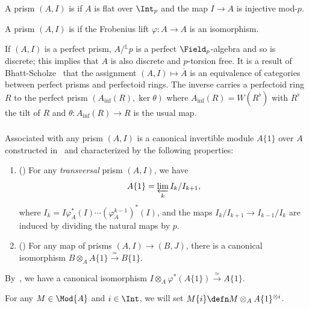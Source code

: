 \documentclass[10pt]{amsart}
\begin{document}
\begin{definition}
A prism $(A,I)$ is  if $A$ is flat over $\Int_p$ and the map $I\to A$ is injective mod-$p$.
\end{definition}


\begin{definition}
A prism $(A,I)$ is  if the Frobenius lift $\varphi:A\to A$ is an isomorphism.
\end{definition}

\begin{remark}
If $(A,I)$ is a perfect prism, $A/{}^{\mathbb{L}}p$ is a perfect $\Field_p$-algebra and so is discrete; this implies that $A$ is also discrete and $p$-torsion free. It is a result of Bhatt-Scholze~\cite[Theorem 3.10]{Bhatt2022-ee} that the assignment $(A,I)\mapsto \overline{A}$ is an equivalence of categories between perfect prisms and perfectoid rings. The inverse carries a perfectoid ring $R$ to the perfect prism $(A_{\mathrm{inf}}(R),\ker \theta)$ where $A_{\mathrm{inf}}(R) = W(R^\flat)$ with $R^\flat$ the tilt of $R$ and $\theta:A_{\mathrm{inf}}(R)\to R$ is the usual map.
\end{remark}


\subsubsection{}
\label{subsubsec:abstract_bk_twist}
Associated with any prism $(A,I)$ is a canonical invertible module $A\{1\}$ over $A$ constructed in~\cite[Proposition 2.5.1]{bhatt2022absolute} and characterized by the following properties:
\begin{enumerate}
    \item (\cite[(2.2.11)]{bhatt2022absolute}) For any \emph{transversal} prism $(A,I)$, we have
   \[
     A\{1\} = \varprojlim_k I_k/I_{k+1},
   \]
   where $I_k = I\varphi_A^*(I)\cdots(\varphi_A^{k-1})^*(I)$, and the maps $I_k/I_{k+1}\to I_{k-1}/I_k$ are induced by dividing the natural maps by $p$.
   \item (\cite[(2.5.3)]{bhatt2022absolute}) For any map of prisms $(A,I)\to (B,J)$, there is a canonical isomorphism $B\otimes_AA\{1\}\xrightarrow{\simeq}B\{1\}$.
\end{enumerate}

By~\cite[Remark 2.5.9]{bhatt2022absolute}, we have a canonical isomorphism $I\otimes_A\varphi^*(A\{1\})\xrightarrow{\simeq}A\{1\}$.

For any $M\in \Mod{A}$ and $i\in\Int$, we will set $M\{i\} \defn M\otimes_A A\{1\}^{\otimes i}$.
\end{document}
